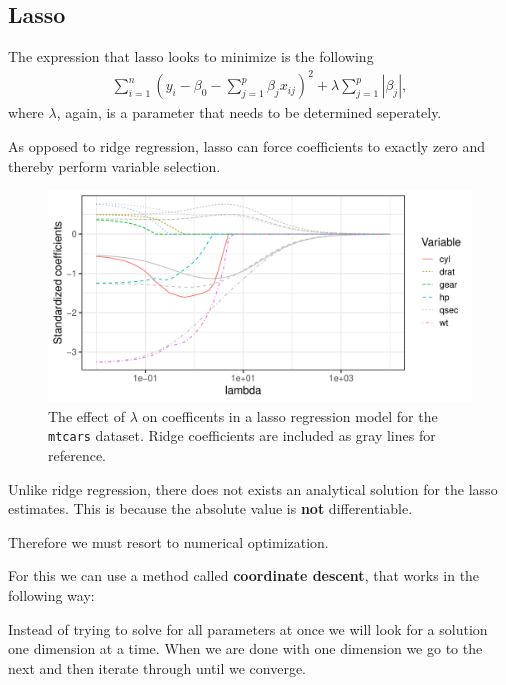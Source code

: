 \documentclass[aspectratio=169,10pt]{beamer}
\begin{document}
\subsection{Lasso}
\begin{frame}{\secname}{\subsecname}
  The expression that lasso looks to minimize is the following
  \begin{align*}
    \sum_{i=1}^n \left(y_i - \beta_0 - \sum_{j=1}^p \beta_j x_{ij}\right)^2 + \lambda \sum_{j=1}^p |\beta_j|, 
  \end{align*}
  where $\lambda$, again, is a parameter that needs to be determined seperately.

  As opposed to ridge regression, lasso can force coefficients to exactly zero and thereby perform variable selection.
\end{frame}

\begin{frame}{\secname}{\subsecname}
  \begin{figure}
    \includegraphics[width=.7\textwidth]{scripts/output/lasso_coefficient.pdf}
    \caption{The effect of $\lambda$ on coefficents in a lasso regression model for the \texttt{mtcars} dataset.
    Ridge coefficients are included as gray lines for reference.}
  \end{figure}
\end{frame}

\begin{frame}{\secname}{\subsecname}
  Unlike ridge regression, there does not exists an analytical solution for the lasso estimates.
  This is because the absolute value is \textbf{not} differentiable.
  
  Therefore we must resort to numerical optimization.

  For this we can use a method called \textbf{coordinate descent}, that works in the following way:

  Instead of trying to solve for all parameters at once we will look for a solution one dimension at a time.
  When we are done with one dimension we go to the next and then iterate through until we converge.
\end{frame}
\end{document}
